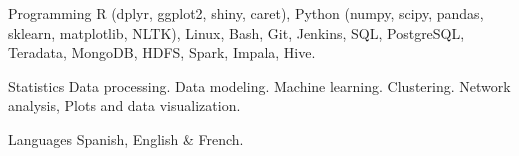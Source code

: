 


\begin{cvskills}


\cvskill
{Programming} %
{R (dplyr, ggplot2, shiny, caret), Python (numpy, scipy, pandas, sklearn, matplotlib, NLTK), Linux, Bash, Git, Jenkins,} %
\cvskill
{}
{SQL, PostgreSQL, Teradata, MongoDB, HDFS, Spark, Impala, Hive.} %


\cvskill
{Statistics} %
{Data processing. Data modeling. Machine learning. Clustering. Network analysis, Plots and data visualization.} %


\cvskill
{Languages} %
{Spanish, English \& French.} %








\end{cvskills}
